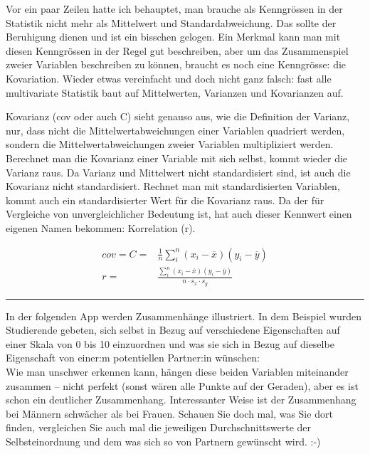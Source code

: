 \documentclass[
  10pt,
  letterpaper,
  a4paper, twoside]{scrreprt}
\begin{document}
Vor ein paar Zeilen hatte ich behauptet, man brauche als Kenngrössen in
der Statistik nicht mehr als Mittelwert und Standardabweichung. Das
sollte der Beruhigung dienen und ist ein bisschen gelogen. Ein Merkmal
kann man mit diesen Kenngrössen in der Regel gut beschreiben, aber um
das Zusammenspiel zweier Variablen beschreiben zu können, braucht es
noch eine Kenngrösse: die Kovariation. Wieder etwas vereinfacht und doch
nicht ganz falsch: fast alle multivariate Statistik baut auf
Mittelwerten, Varianzen und Kovarianzen auf.

Kovarianz (cov oder auch C) sieht genauso aus, wie die Definition der
Varianz, nur, dass nicht die Mittelwertabweichungen einer Variablen
quadriert werden, sondern die Mittelwertabweichungen zweier Variablen
multipliziert werden. Berechnet man die Kovarianz einer Variable mit
sich selbst, kommt wieder die Varianz raus. Da Varianz und Mittelwert
nicht standardisiert sind, ist auch die Kovarianz nicht standardisiert.
Rechnet man mit standardisierten Variablen, kommt auch ein
standardisierter Wert für die Kovarianz raus. Da der für Vergleiche von
unvergleichlicher Bedeutung ist, hat auch dieser Kennwert einen eigenen
Namen bekommen: Korrelation (r).

\begin{align}
      cov = C =  & \frac{1}{n}\sum_i^n(x_i-\overline{x})
          (y_i-\overline{y}) \label{eq:Covarianz} \\
      r = &  \frac{\sum_i^n(x_i-\overline{x})
          (y_i-\overline{y})}{n \cdot s_x \cdot s_y} \label{eq:Korrelation}
\end{align}

\begin{center}\rule{0.5\linewidth}{0.5pt}\end{center}

In der folgenden App werden Zusammenhänge illustriert. In dem Beispiel
wurden Studierende gebeten, sich selbst in Bezug auf verschiedene
Eigenschaften auf einer Skala von 0 bis 10 einzuordnen und was sie sich
in Bezug auf dieselbe Eigenschaft von einer:m potentiellen Partner:in
wünschen:\\

Wie man unschwer erkennen kann, hängen diese beiden Variablen
miteinander zusammen -- nicht perfekt (sonst wären alle Punkte auf der
Geraden), aber es ist schon ein deutlicher Zusammenhang. Interessanter
Weise ist der Zusammenhang bei Männern schwächer als bei Frauen. Schauen
Sie doch mal, was Sie dort finden, vergleichen Sie auch mal die
jeweiligen Durchschnittswerte der Selbsteinordnung und dem was sich so
von Partnern gewünscht wird. :-)
\end{document}
